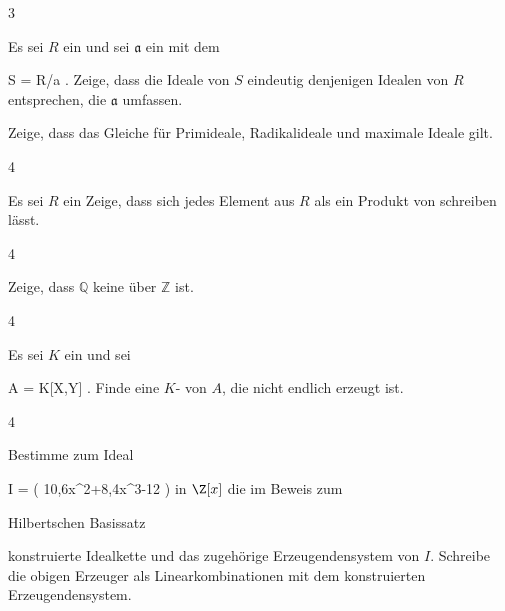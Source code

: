 

{3}
{




Es sei $R$ ein
und sei ${\mathfrak a}$ ein
mit dem

\mavergleichskettedisp
{\vergleichskette
{ S
}
{ =} { R/{\mathfrak a}
}
{ } {
}
{ } {
}
{ } {
}
}
{}{}{.}
Zeige, dass die Ideale von $S$ eindeutig denjenigen Idealen von $R$ entsprechen, die ${\mathfrak a}$ umfassen.




}
{Zeige, dass das Gleiche für Primideale, Radikalideale und maximale Ideale gilt.} {}


{4}
{




Es sei $R$ ein
Zeige, dass sich jedes Element aus $R$ als ein Produkt von
schreiben lässt.




}
{} {}


{4}
{




Zeige, dass $\mathbb Q$ keine
 über $\mathbb Z$ ist.




}
{} {}


{4}
{




Es sei $K$ ein
und sei

\mavergleichskette
{\vergleichskette
{ A
}
{ = }{ K[X,Y]
}
{  }{
}
{    }{
}
{   }{
}
}
{}{}{.}
Finde eine
$K$-
von $A$, die nicht endlich erzeugt ist.




}
{} {}


{4}
{




Bestimme zum Ideal

\mavergleichskettedisp
{\vergleichskette
{ I
}
{ =} { \left(  10,6x^2+8,4x^3-12  \right)
}
{ } {
}
{ } {
}
{ } {
}
}
{}{}{}
in $\Z[x]$ die im Beweis zum

Hilbertschen Basissatz

konstruierte Idealkette und das zugehörige Erzeugendensystem von $I$. Schreibe die obigen Erzeuger als Linearkombinationen mit dem konstruierten Erzeugendensystem.




}
{} {}
